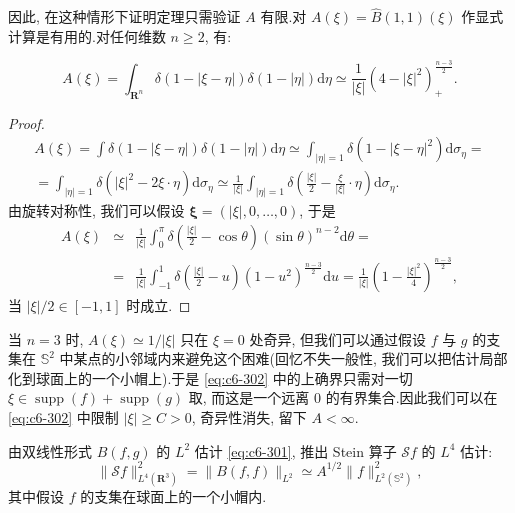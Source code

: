 因此, 在这种情形下证明定理只需验证 $A$ 有限.对 $A(\xi) = \hat{B}(1, 1)(\xi)$ 作显式计算是有用的.对任何维数 $n \geq 2$, 有:

\begin{lemma}\label{lem:c6-8.22}
\begin{equation}
A(\xi) = \int_{\mathbf{R}^n} \delta(1 - |\xi - \eta|) \delta(1 - |\eta|) \mathrm{d}\eta \simeq \frac{1}{|\xi|} \left(4 - |\xi|^2\right)_+^{\frac{n-3}{2}}.\label{eq:c6-303}
\end{equation}
\end{lemma}

\begin{proof}
\[
\begin{array}{c}
A(\xi) = \int \delta(1 - |\xi - \eta|) \delta(1 - |\eta|) \mathrm{d}\eta \simeq \int_{|\eta| = 1} \delta(1 - |\xi - \eta|^2) \mathrm{d}\sigma_\eta = \\
= \int_{|\eta| = 1} \delta(|\xi|^2 - 2\xi \cdot \eta) \mathrm{d}\sigma_\eta \simeq \frac{1}{|\xi|} \int_{|\eta| = 1} \delta\left(\frac{|\xi|}{2} - \frac{\xi}{|\xi|} \cdot \eta\right) \mathrm{d}\sigma_\eta.
\end{array}
\]
由旋转对称性, 我们可以假设 $\boldsymbol{\xi} = (|\xi|, 0, \ldots, 0)$, 于是
\[
\begin{array}{rcl}
A(\xi) &\simeq& \frac{1}{|\xi|} \int_0^\pi \delta\left(\frac{|\xi|}{2} - \cos\theta\right) (\sin\theta)^{n-2} \mathrm{d}\theta = \\
&=& \frac{1}{|\xi|} \int_{-1}^1 \delta\left(\frac{|\xi|}{2} - u\right) (1 - u^2)^{\frac{n-3}{2}} \mathrm{d}u = \frac{1}{|\xi|} \left(1 - \frac{|\xi|^2}{4}\right)^{\frac{n-3}{2}},
\end{array}
\]
当 $|\xi|/2 \in [-1, 1]$ 时成立.
\end{proof}

当 $n = 3$ 时, $A(\xi) \simeq 1/|\xi|$ 只在 $\xi = 0$ 处奇异, 但我们可以通过假设 $f$ 与 $g$ 的支集在 $\mathbb{S}^2$ 中某点的小邻域内来避免这个困难(回忆不失一般性, 我们可以把估计局部化到球面上的一个小帽上).于是 \eqref{eq:c6-302} 中的上确界只需对一切 $\xi \in \operatorname{supp}(f) + \operatorname{supp}(g)$ 取, 而这是一个远离 0 的有界集合.因此我们可以在 \eqref{eq:c6-302} 中限制 $|\xi| \ge C > 0$, 奇异性消失, 留下 $A < \infty$.

由双线性形式 $B(f, g)$ 的 $L^2$ 估计 \eqref{eq:c6-301}, 推出 Stein 算子 $\mathcal{S} f$ 的 $L^4$ 估计:
\[
\|\mathcal{S} f\|^2_{L^4(\mathbf{R}^3)} = \|B(f, f)\|_{L^2} \simeq A^{1/2} \|f\|^2_{L^2(\mathbb{S}^2)},
\]
其中假设 $f$ 的支集在球面上的一个小帽内.

